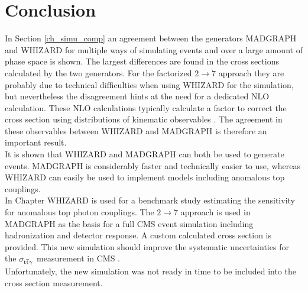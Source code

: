 \section{Conclusion}

In Section \ref{ch_simu_comp} an agreement between the generators MADGRAPH and WHIZARD for multiple ways of simulating \ttgamma events and over a large amount of phase space is shown. The largest differences are found in the cross sections calculated by the two generators. For the factorized $2 \to 7$ approach they are probably due to technical difficulties when using WHIZARD for the simulation, but nevertheless the disagreement hints at the need for a dedicated NLO calculation. These NLO calculations typically calculate a factor to correct the cross section using distributions of kinematic observables . The agreement in these observables between WHIZARD and MADGRAPH is therefore an important result.\\
It is shown that WHIZARD and MADGRAPH can both be used to generate \ttgamma events. MADGRAPH is considerably faster and technically easier to use, whereas WHIZARD can easily be used to implement models including anomalous top couplings. \\
In Chapter  WHIZARD is used for a benchmark study estimating the sensitivity for anomalous top photon couplings. The $2 \to 7$ approach is used in MADGRAPH as the basis for a full CMS event simulation  including hadronization and detector response. A custom calculated cross section is provided.  This new simulation should improve the systematic uncertainties for the $\sigma_{\mathrm{t}\overline{\mathrm{t}} \gamma}$ measurement in CMS . \\
Unfortunately, the new simulation was not ready in time to be included into the cross section measurement.